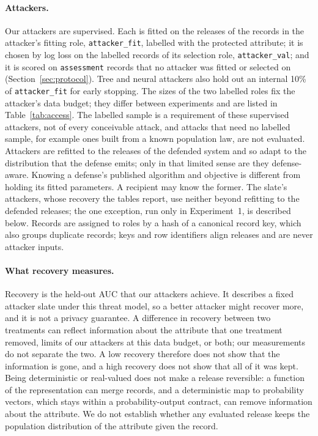 \documentclass[10pt]{article}
\begin{document}
\paragraph{Attackers.} Our attackers are supervised. Each is fitted on the releases of the records in the attacker's
fitting role, \texttt{attacker\_fit}, labelled with the protected attribute; it is chosen by log loss on the labelled
records of its selection role, \texttt{attacker\_val}; and it is scored on \texttt{assessment} records that no attacker
was fitted or selected on (Section~\ref{sec:protocol}). Tree and
neural attackers also hold out an internal 10\% of \texttt{attacker\_fit} for early stopping. The sizes of the two
labelled roles fix the attacker's data budget; they differ between experiments and are listed in
Table~\ref{tab:access}. The labelled sample is a requirement of these supervised attackers, not of every conceivable
attack, and attacks that need no labelled sample, for example ones built from a known population law, are not
evaluated. Attackers are refitted to the releases of the defended system and so adapt to the distribution that the
defense emits; only in that limited sense are they defense-aware. Knowing a defense's published algorithm and objective
is different from holding its fitted parameters. A recipient may know the former. The slate's attackers, whose recovery
the tables report, use neither beyond refitting to the defended releases; the one exception, run only in Experiment~1,
is described below. Records are assigned to roles by a hash of a canonical
record key, which also groups duplicate records; keys and row identifiers align releases and are never attacker
inputs.

\paragraph{What recovery measures.} Recovery is the held-out AUC that our attackers achieve. It describes a fixed
attacker slate under this threat model, so a better attacker might recover more, and it is not a privacy guarantee. A
difference in recovery between two treatments can reflect information about the attribute that one treatment removed,
limits of our attackers at this data budget, or both; our measurements do not separate the two. A low recovery
therefore does not show that the information is gone, and a high recovery does not show that all of it was kept. Being
deterministic or real-valued does not make a release reversible: a function of the representation can merge records,
and a deterministic map to probability vectors, which stays within a probability-output contract, can remove
information about the attribute. We do not establish whether any evaluated release keeps the population distribution of
the attribute given the record.
\end{document}
